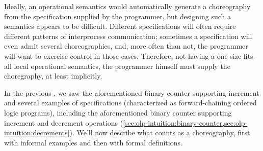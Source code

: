 \documentclass[
  class=../hdeyoung-proposal,
  crop=false
]{standalone}
\begin{document}
Ideally, an operational semantics would automatically generate a choreography from the specification supplied by the programmer, but designing such a semantics appears to be difficult.
Different specifications will often require different patterns of interprocess communication;
sometimes a specification will even admit several choreographies, and, more often than not, the programmer will want to exercise control in those cases.
Therefore, not having a one-size-fits-all local operational semantics, the programmer himself must supply the choregraphy, at least implicitly.

In the previous , we saw the aforementioned binary counter supporting increment and  several examples of specifications (characterized as forward-chaining ordered logic programs), including the aforementioned binary counter supporting increment and decrement operations (\cref{sec:olp-intuition:binary-counter,sec:olp-intuition:decrements}).
We'll now describe what counts as a choreography, first with informal examples and then with formal definitions.
\end{document}

